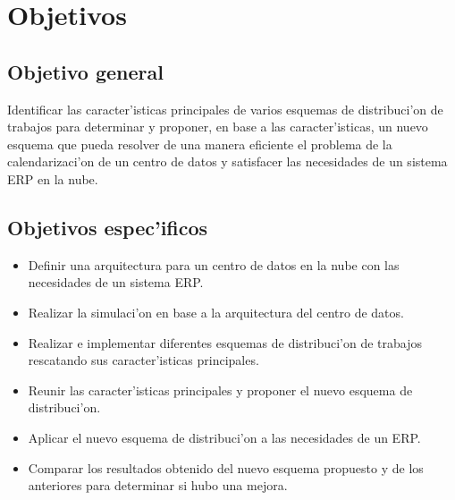 
\chapter*{Objetivos}

\section*{Objetivo general}

Identificar las caracter'isticas principales de varios esquemas de distribuci'on de trabajos para determinar y proponer, en base a las caracter'isticas, un nuevo esquema que pueda resolver de una manera eficiente el problema de la calendarizaci'on de un centro de datos y satisfacer las necesidades de un sistema ERP en la nube.

\section*{Objetivos espec'ificos}


\begin{itemize}
\item Definir una arquitectura para un centro de datos en la nube con las necesidades de un sistema ERP.
\item Realizar la simulaci'on en base a la arquitectura del centro de datos.
\item Realizar e implementar diferentes esquemas de distribuci'on de trabajos rescatando sus caracter'isticas principales.
\item Reunir las caracter'isticas principales y proponer el nuevo esquema de distribuci'on.
\item Aplicar el nuevo esquema de distribuci'on a las necesidades de un ERP.
\item Comparar los resultados obtenido del nuevo esquema propuesto y de los anteriores para determinar si hubo una mejora.
\end{itemize}
